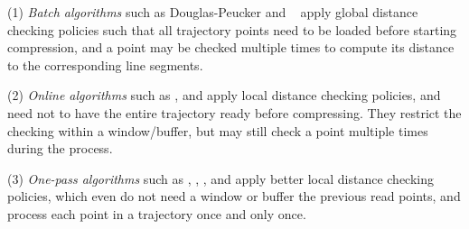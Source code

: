 \sstab (1) {\em Batch algorithms} such as Douglas-Peucker\cite{Douglas:Peucker,Meratnia:Spatiotemporal} and \pavlidis~\cite{Pavlidis:Segment} apply global distance checking policies such that all trajectory points need to be loaded before starting compression, and a point may be checked multiple times to compute its distance to the corresponding line segments.

\sstab (2) {\em Online algorithms} such as \opwa \cite{Meratnia:Spatiotemporal}, \squishe \cite{Muckell:SQUISH} and \bqsa \cite{Liu:BQS} apply local distance checking policies, and need not to have the entire trajectory ready before compressing. They restrict the checking within a window/buffer, but may still check a point  multiple times during the process.

\sstab (3) {\em One-pass algorithms} such as \operb\cite{Lin:Operb}, \siped \cite{Williams:Longest,Sklansky:Cone,Dunham:Cone, Zhao:Sleeve}, \cised \cite{Lin:Cised}, \intersec\cite{Long:Direction} and \interval \cite{Ke:Interval} apply better local distance checking policies, which even do not need a window or buffer the previous read points, and process each point in a trajectory once and only once.





